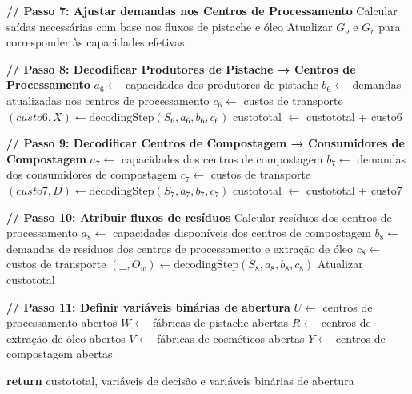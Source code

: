 \documentclass[conference]{IEEEtran}
\begin{document}
\begin{algorithm}
  \caption{Decodificação do cromossomo para a cadeia de suprimentos (Parte 2)}
  \label{algoDecode2}
  \begin{algorithmic}[1]
  \State \textbf{// Passo 7: Ajustar demandas nos Centros de Processamento}
      \State Calcular saídas necessárias com base nos fluxos de pistache e óleo
      \State Atualizar $G_o$ e $G_r$ para corresponder às capacidades efetivas
  \EndFor

  \State \textbf{// Passo 8: Decodificar Produtores de Pistache → Centros de Processamento}
  \State $a_6 \leftarrow$ capacidades dos produtores de pistache
  \State $b_6 \leftarrow$ demandas atualizadas nos centros de processamento
  \State $c_6 \leftarrow$ custos de transporte
  \State $(custo6, X) \leftarrow \text{decodingStep}(S_6, a_6, b_6, c_6)$
  \State custototal $\leftarrow$ custototal + custo6
    
  \State \textbf{// Passo 9: Decodificar Centros de Compostagem → Consumidores de Compostagem}
  \State $a_7 \leftarrow$ capacidades dos centros de compostagem
  \State $b_7 \leftarrow$ demandas dos consumidores de compostagem
  \State $c_7 \leftarrow$ custos de transporte
  \State $(custo7, D) \leftarrow \text{decodingStep}(S_7, a_7, b_7, c_7)$
  \State custototal $\leftarrow$ custototal + custo7
    
  \State \textbf{// Passo 10: Atribuir fluxos de resíduos}
  \State Calcular resíduos dos centros de processamento
  \State $a_8 \leftarrow$ capacidades disponíveis dos centros de compostagem
  \State $b_8 \leftarrow$ demandas de resíduos dos centros de processamento e extração de óleo
  \State $c_8 \leftarrow$ custos de transporte
  \State $(\_\_, O_w) \leftarrow \text{decodingStep}(S_8, a_8, b_8, c_8)$
  \State Atualizar custototal
    
  \State \textbf{// Passo 11: Definir variáveis binárias de abertura}
  \State $U \leftarrow$ centros de processamento abertos
  \State $W \leftarrow$ fábricas de pistache abertas
  \State $R \leftarrow$ centros de extração de óleo abertos
  \State $V \leftarrow$ fábricas de cosméticos abertas
  \State $Y \leftarrow$ centros de compostagem abertas
    
  \State \textbf{return} custototal, variáveis de decisão e variáveis binárias de abertura
  \EndProcedure
  \end{algorithmic}
\end{algorithm}
\end{document}
